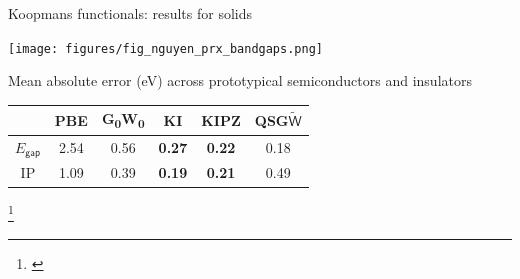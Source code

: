 \documentclass[xcolor=table,aspectratio=169]{beamer}
\newcommand\blfootcite[1]{%
  \begingroup
  \renewcommand\thefootnote{}\footnote{\hspace{-4ex}\cite{#1}}%
  \addtocounter{footnote}{-1}%
  \endgroup
}
\numberwithin{equation}{section}
\begin{document}
\begin{frame}{Koopmans functionals: results for solids}
   \begin{minipage}[c]{0.35\textwidth}
      \texttt{[image: figures/fig\_nguyen\_prx\_bandgaps.png]}
   \end{minipage}
   \hspace{1em}
   \begin{minipage}[c]{0.6\textwidth}

      \footnotesize
      Mean absolute error (eV) across prototypical semiconductors and insulators

      \vspace{1ex}
      \begin{tabular}{c S[table-format = 2.2] S[table-format = 2.2] >{\color{seaborn_red}\bfseries}S[table-format = 2.2] >{\color{seaborn_red}\bfseries}S[table-format = 2.2] S[table-format = 2.2]}
                          & {PBE} & {G\textsubscript{0}W\textsubscript{0}} & {KI} & {KIPZ} & {QSG$\tilde{\mathsf{W}}$} \\
         \midrule
         \midrule
         $E_\mathsf{gap}$ & 2.54  & 0.56                                   & 0.27 & 0.22   & 0.18                      \\
         \midrule
         IP               & 1.09  & 0.39                                   & 0.19 & 0.21   & 0.49                      \\
      \end{tabular}
   \end{minipage}

   \blfootcite{Nguyen2018}
\end{frame}
\end{document}
